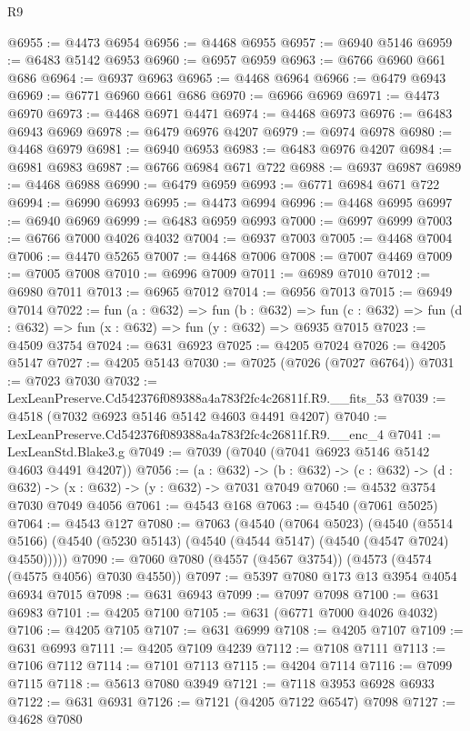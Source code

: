 \begin{lexlean}{R9}
\begin{coremodule}
@6955 := @4473 @6954
@6956 := @4468 @6955
@6957 := @6940 @5146
@6959 := @6483 @5142 @6953
@6960 := @6957 @6959
@6963 := @6766 @6960 @661 @686
@6964 := @6937 @6963
@6965 := @4468 @6964
@6966 := @6479 @6943
@6969 := @6771 @6960 @661 @686
@6970 := @6966 @6969
@6971 := @4473 @6970
@6973 := @4468 @6971 @4471
@6974 := @4468 @6973
@6976 := @6483 @6943 @6969
@6978 := @6479 @6976 @4207
@6979 := @6974 @6978
@6980 := @4468 @6979
@6981 := @6940 @6953
@6983 := @6483 @6976 @4207
@6984 := @6981 @6983
@6987 := @6766 @6984 @671 @722
@6988 := @6937 @6987
@6989 := @4468 @6988
@6990 := @6479 @6959
@6993 := @6771 @6984 @671 @722
@6994 := @6990 @6993
@6995 := @4473 @6994
@6996 := @4468 @6995
@6997 := @6940 @6969
@6999 := @6483 @6959 @6993
@7000 := @6997 @6999
@7003 := @6766 @7000 @4026 @4032
@7004 := @6937 @7003
@7005 := @4468 @7004
@7006 := @4470 @5265
@7007 := @4468 @7006
@7008 := @7007 @4469
@7009 := @7005 @7008
@7010 := @6996 @7009
@7011 := @6989 @7010
@7012 := @6980 @7011
@7013 := @6965 @7012
@7014 := @6956 @7013
@7015 := @6949 @7014
@7022 := fun (a : @632) =>
  fun (b : @632) =>
  fun (c : @632) => fun (d : @632) => fun (x : @632) => fun (y : @632) => @6935 @7015
@7023 := @4509 @3754
@7024 := @631 @6923
@7025 := @4205 @7024
@7026 := @4205 @5147
@7027 := @4205 @5143
@7030 := @7025 (@7026 (@7027 @6764))
@7031 := @7023 @7030
@7032 := LexLeanPreserve.Cd542376f089388a4a783f2fc4c26811f.R9.__fits_53
@7039 := @4518 (@7032 @6923 @5146 @5142 @4603 @4491 @4207)
@7040 := LexLeanPreserve.Cd542376f089388a4a783f2fc4c26811f.R9.__enc_4
@7041 := LexLeanStd.Blake3.g
@7049 := @7039 (@7040 (@7041 @6923 @5146 @5142 @4603 @4491 @4207))
@7056 := (a : @632) ->
  (b : @632) -> (c : @632) -> (d : @632) -> (x : @632) -> (y : @632) -> @7031 @7049
@7060 := @4532 @3754 @7030 @7049 @4056
@7061 := @4543 @168
@7063 := @4540 (@7061 @5025)
@7064 := @4543 @127
@7080 := @7063
    (@4540
      (@7064 @5023)
      (@4540 (@5514 @5166) (@4540 (@5230 @5143) (@4540 (@4544 @5147) (@4540 (@4547 @7024) @4550)))))
@7090 := @7060 @7080 (@4557 (@4567 @3754)) (@4573 (@4574 (@4575 @4056) @7030 @4550))
@7097 := @5397 @7080 @173 @13 @3954 @4054 @6934 @7015
@7098 := @631 @6943
@7099 := @7097 @7098
@7100 := @631 @6983
@7101 := @4205 @7100
@7105 := @631 (@6771 @7000 @4026 @4032)
@7106 := @4205 @7105
@7107 := @631 @6999
@7108 := @4205 @7107
@7109 := @631 @6993
@7111 := @4205 @7109 @4239
@7112 := @7108 @7111
@7113 := @7106 @7112
@7114 := @7101 @7113
@7115 := @4204 @7114
@7116 := @7099 @7115
@7118 := @5613 @7080 @3949
@7121 := @7118 @3953 @6928 @6933
@7122 := @631 @6931
@7126 := @7121 (@4205 @7122 @6547) @7098
@7127 := @4628 @7080

\end{coremodule}
\end{lexlean}
